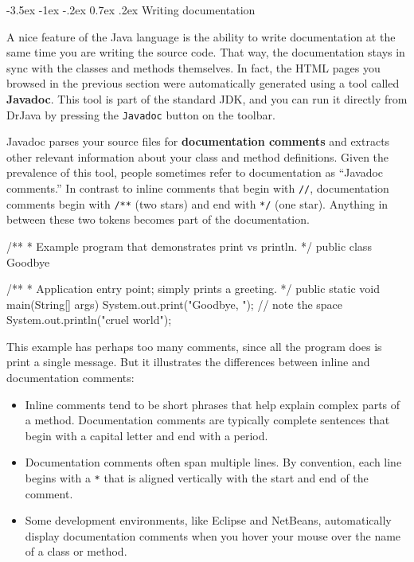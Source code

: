 \documentclass[12pt]{book}
\makeatletter
\theoremstyle{exercise}
\newcommand{\java}[1]{\verb"#1"}
\renewcommand{\section}{\@startsection{section}{1}{\z@}%
    {-3.5ex \@plus -1ex \@minus -.2ex}%
    {0.7ex \@plus.2ex}%
    {\normalfont\Large\bfseries}}
\newcommand{\java}[1]{\lstinline{#1}} %
\makeatother
\begin{document}
\section{Writing documentation}


A nice feature of the Java language is the ability to write documentation at the same time you are writing the source code.
That way, the documentation stays in sync with the classes and methods themselves.
In fact, the HTML pages you browsed in the previous section were automatically generated using a tool called {\bf Javadoc}.
This tool is part of the standard JDK, and you can run it directly from DrJava by pressing the {\tt Javadoc} button on the toolbar.


Javadoc parses your source files for {\bf documentation comments} and extracts other relevant information about your class and method definitions.
Given the prevalence of this tool, people sometimes refer to documentation as ``Javadoc comments.''
In contrast to inline comments that begin with \java{//}, documentation comments begin with \java{/**} (two stars) and end with \java{*/} (one star).
Anything in between these two tokens becomes part of the documentation.

\begin{code}
/**
 * Example program that demonstrates print vs println.
 */
public class Goodbye {

    /**
     * Application entry point; simply prints a greeting.
     */
    public static void main(String[] args) {
        System.out.print("Goodbye, ");  // note the space
        System.out.println("cruel world");
    }

}
\end{code}

This example has perhaps too many comments, since all the program does is print a single message.
But it illustrates the differences between inline and documentation comments:

\begin{itemize}
\item Inline comments tend to be short phrases that help explain complex parts of a method.
Documentation comments are typically complete sentences that begin with a capital letter and end with a period.

\item Documentation comments often span multiple lines.
By convention, each line begins with a \java{*} that is aligned vertically with the start and end of the comment.

\item Some development environments, like Eclipse and NetBeans, automatically display documentation comments when you hover your mouse over the name of a class or method.

\end{itemize}
\end{document}
